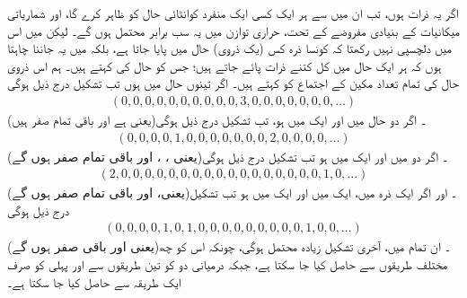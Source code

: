 اگر یہ ذرات  ہوں، تب ان میں سے ہر ایک کسی ایک منفرد کوانٹائی حال کو ظاہر کرے گا، اور شماریاتی میکانیات کے بنیادی مفروضے کے تحت، حراری توازن میں یہ سب برابر محتمل ہوں گے۔ لیکن میں اس میں دلچسپی نہیں رکھتا کہ کونسا ذرہ کس (یک ذروی) حال میں پایا جاتا ہے، بلکہ میں یہ جاننا چاہتا ہوں کہ ہر ایک حال میں کل کتنے ذرات پائے جاتے ہیں؛ جس کو حال کی   کہتے ہیں۔ ہم اس  ذروی حال کی تمام تعداد مکین کے اجتماع کو  کہتے ہیں۔ اگر تینوں حال  میں ہوں تب تشکیل درج ذیل ہوگی
\begin{align}\label{مساوات_متماثل_تشکیل_الف}
	(0, 0, 0, 0, 0, 0, 0, 0, 0, 0, 3, 0, 0, 0, 0, 0, 0, 0, \dots)
\end{align} 
(یعنی  ہے اور باقی تمام صفر ہیں)۔ اگر دو حال  میں اور ایک  میں ہو، تب تشکیل درج ذیل ہوگی
\begin{align}\label{مساوات_متماثل_تشکیل_ب}
	(0, 0, 0, 0, 1, 0, 0, 0, 0, 0, 0, 0, 2, 0, 0, 0, 0, \dots)
\end{align} 
(یعنی ، ، اور باقی تمام صفر ہوں گے)۔ اگر دو  میں اور ایک  میں ہو تب تشکیل درج ذیل ہوگی
\begin{align}\label{مساوات_متماثل_تشکیل_پ}
	(2, 0, 0, 0, 0, 0, 0, 0, 0, 0, 0, 0, 0, 0, 0, 0, 0, 0, 1, 0, \dots)
\end{align} 
(یعنی،  اور باقی تمام صفر ہوں گے)۔ اور اگر ایک ذرہ  میں، ایک  میں اور ایک  میں ہو تب تشکیل درج ذیل ہوگی
\begin{align}\label{مساوات_متماثل_تشکیل_ت}
	(0, 0, 0, 0, 1, 0, 1, 0, 0, 0, 0, 0, 0, 0, 0, 0, 1, 0, 0, \dots)
\end{align} 
(یعنی  اور باقی صفر ہوں گے)۔ ان تمام میں، آخری تشکیل زیادہ محتمل ہوگی، چونکہ اس کو چھ مختلف طریقوں سے حاصل کیا جا سکتا ہے، جبکہ درمیانی دو کو تین طریقوں سے اور پہلی کو صرف ایک طریقہ سے حاصل کیا جا سکتا ہے۔

